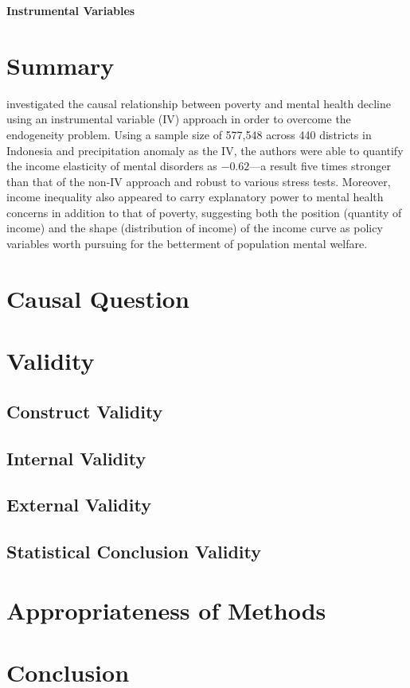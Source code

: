 \begin{center}
    \textbf{Instrumental Variables}
\end{center}

\begin{hangparas}{0.5in}{1}
\end{hangparas}

\bigskip

\section{Summary}

\textcite{hanandita:2014} investigated the causal relationship between poverty and mental health decline using an instrumental variable (IV) approach in order to overcome the endogeneity problem. Using a sample size of 577,548 across 440 districts in Indonesia and precipitation anomaly as the IV, the authors were able to quantify the income elasticity of mental disorders as $-0.62$---a result five times stronger than that of the non-IV approach and robust to various stress tests. Moreover, income inequality also appeared to carry explanatory power to mental health concerns in addition to that of poverty, suggesting both the position (quantity of income) and the shape (distribution of income) of the income curve as policy variables worth pursuing for the betterment of population mental welfare.

\section{Causal Question}

\section{Validity}

\subsection{Construct Validity}

\subsection{Internal Validity}

\subsection{External Validity}

\subsection{Statistical Conclusion Validity}

\section{Appropriateness of Methods}

\section{Conclusion}

